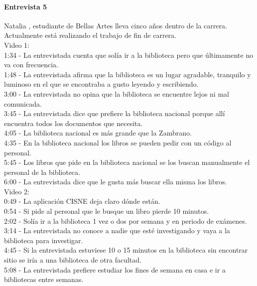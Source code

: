\documentclass[12pt]{article}
\begin{document}
\paragraph{Entrevista 5}
 
Natalia , estudiante de Bellas Artes lleva cinco años dentro de la carrera. Actualmente está realizando el trabajo de fin de carrera. \\

Video 1: \\
1:34 - La entrevistada cuenta que solía ir a la biblioteca pero que últimamente no va con frecuencia. \\
1:48 - La entrevistada afirma que la biblioteca es un lugar agradable, tranquilo y luminoso en el que se encontraba a gusto leyendo y escribiendo.\\
3:00 - La entrevistada no opina que la biblioteca se encuentre lejos ni mal comunicada. \\
3:45 - La entrevistada dice que prefiere la biblioteca nacional porque allí encuentra todos los documentos que necesita. \\
4:05 - La biblioteca nacional es más grande que la Zambrano. \\
4:35 - En la biblioteca nacional los libros se pueden pedir con un código al personal. \\
5:45 -  Los libros que pide en la biblioteca nacional se los buscan manualmente el personal de la biblioteca.\\
6:00 - La entrevistada dice que le gusta más buscar ella misma los libros.\\

Video 2:  \\
0:49 - La aplicación CISNE deja claro dónde están. \\
0:54 - Si pide al personal que le busque un libro pierde 10 minutos.\\
2:02 - Solía ir a la biblioteca 1 vez o dos por semana y en periodo de exámenes. \\
3:14 - La entrevistada no conoce a nadie que esté investigando y vaya a la biblioteca para investigar. \\
4:45 - Si la entrevistada estuviese 10 o 15 minutos en la biblioteca sin encontrar sitio se iría a una biblioteca de otra facultad. \\
5:08 - La entrevistada prefiere estudiar los fines de semana en casa e ir a bibliotecas entre semanas.\\
 
\end{document}
